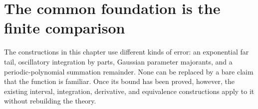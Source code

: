 \section{The common foundation is the finite comparison}
The constructions in this chapter use different kinds of error: an
exponential far tail, oscillatory integration by parts, Gaussian parameter
majorants, and a periodic-polynomial summation remainder.  None can be
replaced by a bare claim that the function is familiar.  Once its bound
has been proved, however, the existing interval, integration, derivative,
and equivalence constructions apply to it without rebuilding the theory.
